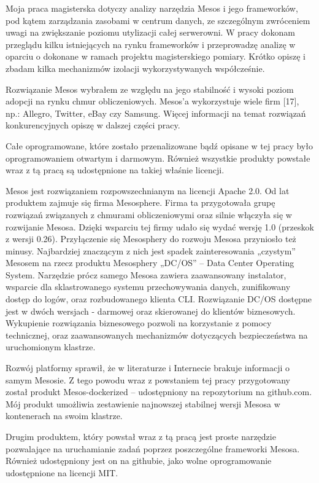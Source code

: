 \documentclass[10pt,a4paper,titlepage,twoside]{report}
\begin{document}
Moja praca magisterska dotyczy analizy narzędzia Mesos i jego frameworków, pod kątem zarządzania zasobami w centrum danych, ze szczególnym zwróceniem uwagi na zwiększanie poziomu utylizacji całej serwerowni. W pracy dokonam przeglądu kilku istniejących na rynku frameworków i przeprowadzę analizę w oparciu o dokonane w ramach projektu magisterskiego pomiary. Krótko opiszę i zbadam kilka mechanizmów izolacji wykorzystywanych współcześnie.

Rozwiązanie Mesos wybrałem ze względu na jego stabilność i wysoki poziom adopcji na rynku chmur obliczeniowych. Mesos’a wykorzystuje wiele firm [17], np.: Allegro, Twitter, eBay czy Samsung. Więcej informacji na temat rozwiązań konkurencyjnych opiszę w dalszej części pracy.

Całe oprogramowane, które zostało przenalizowane bądź opisane w tej pracy było oprogramowaniem otwartym i darmowym. Również wszystkie produkty powstałe wraz z tą pracą są udostępnione na takiej właśnie licencji.

Mesos jest rozwiązaniem rozpowszechnianym na licencji Apache 2.0. Od lat produktem zajmuje się firma Mesosphere. Firma ta przygotowała grupę rozwiązań związanych z chmurami obliczeniowymi oraz silnie włączyła się w rozwijanie Mesosa. Dzięki wsparciu tej firmy udało się wydać wersję 1.0 (przeskok z wersji 0.26). Przyłączenie się Mesosphery do rozwoju Mesosa przyniosło też minusy. Najbardziej znaczącym z nich jest spadek zainteresowania „czystym” Mesosem na rzecz produktu Mesosphery „DC/OS” – Data Center Operating System. Narzędzie prócz samego Mesosa zawiera zaawansowany instalator, wsparcie dla sklastrowanego systemu przechowywania danych, zunifikowany dostęp do logów, oraz rozbudowanego klienta CLI. Rozwiązanie DC/OS dostępne jest w dwóch wersjach - darmowej oraz skierowanej do klientów biznesowych. Wykupienie rozwiązania biznesowego pozwoli na korzystanie z pomocy technicznej, oraz zaawansowanych mechanizmów dotyczących bezpieczeństwa na uruchomionym klastrze.

Rozwój platformy sprawił, że w literaturze i Internecie brakuje informacji o samym Mesosie. Z tego powodu wraz z powstaniem tej pracy przygotowany został produkt Mesos-dockerized – udostępniony na repozytorium na github.com. Mój produkt umożliwia zestawienie najnowszej stabilnej wersji Mesosa w kontenerach na swoim klastrze.

Drugim produktem, który powstał wraz z tą pracą jest proste narzędzie pozwalające na uruchamianie zadań poprzez poszczególne frameworki Mesosa. Również udostępniony jest on na githubie, jako wolne oprogramowanie udostępnione na licencji MIT.
\end{document}
